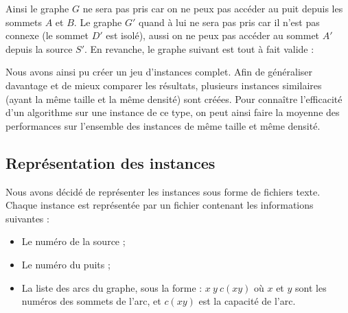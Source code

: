 \documentclass[a4paper]{article}
\begin{document}
Ainsi le graphe $G$ ne sera pas pris car on ne peux pas accéder au puit depuis les sommets $A$ et $B$. Le graphe $G'$ quand à lui ne sera pas pris car il n'est pas connexe (le sommet $D'$ est isolé), aussi on ne peux pas accéder au sommet $A'$ depuis la source $S'$. En revanche, le graphe suivant est tout à fait valide :

\begin{center}
\end{center}
Nous avons ainsi pu créer un jeu d’instances complet. Afin de généraliser davantage et de mieux comparer les résultats, plusieurs instances similaires (ayant la même taille et la même densité) sont créées. Pour connaître l’efficacité d’un algorithme sur une instance de ce type, on peut ainsi faire la moyenne des performances sur l’ensemble des instances de même taille et même densité.
\subsection{Représentation des instances}
Nous avons décidé de représenter les instances sous forme de fichiers texte. Chaque instance est représentée par un fichier contenant les informations suivantes :
\begin{itemize}
	\item Le numéro de la source ;
	\item Le numéro du puits ;
	\item La liste des arcs du graphe, sous la forme : $x\ y\ c(xy)$ où $x$ et $y$ sont les numéros des sommets de l’arc, et $c(xy)$ est la capacité de l’arc.
\end{itemize}
\end{document}
